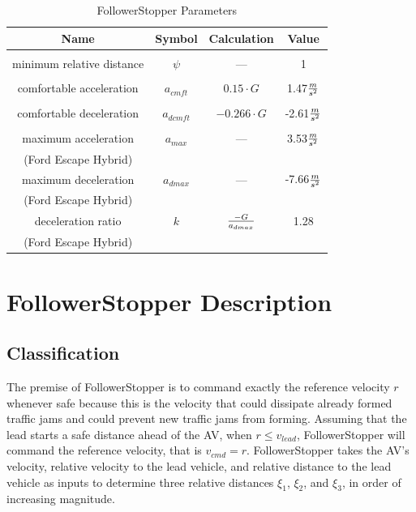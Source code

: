 \documentclass[conference]{IEEEtran}
\begin{document}
\begin{table}[htbp]
\caption{FollowerStopper Parameters}
\begin{center}
\begin{tabular}{|c|c|c|c|}
\hline
\textbf{Name} & \textbf{Symbol} & \textbf{Calculation} & \textbf{Value} \\
\hline
					&				&						&					\\
minimum relative distance	&	$\psi$		&	---					&	1				\\
					&				&						&					\\
comfortable acceleration	&	$a_{cmft}$	&	$0.15\cdot G$			&	1.47$m\over s^2$	\\
					&				&						&					\\
comfortable deceleration	&	$a_{dcmft}$	&	$-0.266\cdot G$		&	-2.61$m\over s^2$	\\
					&				&						&					\\
maximum acceleration	&	$a_{max}$	&	---					&	3.53$m\over s^2$	\\
(Ford Escape Hybrid)	&				&						&					\\
maximum deceleration	&	$a_{dmax}$	&	---					&	-7.66$m\over s^2$	\\
(Ford Escape Hybrid)	&				&						&					\\
deceleration ratio		&	$k$			&	$-G\over a_{dmax}$		&	1.28				\\
(Ford Escape Hybrid)	&				&						&					\\

\hline
\end{tabular}
\label{tab1}
\end{center}
\end{table}






\section{FollowerStopper Description}

\subsection{Classification}
The premise of FollowerStopper is to command exactly the reference velocity $r$ whenever safe because this is the velocity that could dissipate already formed traffic jams and could prevent new traffic jams from forming. Assuming that the lead starts a safe distance ahead of the AV, when $r\leq v_{lead}$, FollowerStopper will command the reference velocity, that is $v_{cmd}=r$. FollowerStopper takes the AV's velocity, relative velocity to the lead vehicle, and relative distance to the lead vehicle as inputs to determine three relative distances $\xi_1$, $\xi_2$, and $\xi_3$, in order of increasing magnitude.
\end{document}
